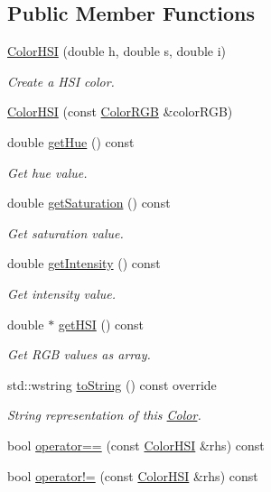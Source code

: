 \subsection*{Public Member Functions}
\begin{DoxyCompactItemize}
\item 
\hyperlink{classmastermind_1_1logic_1_1_color_h_s_i_a6e7465e8b360f30c35a6a27af15edfbe}{Color\+H\+SI} (double h, double s, double i)
\begin{DoxyCompactList}\small\item\em Create a H\+SI color. \end{DoxyCompactList}\item 
\hyperlink{classmastermind_1_1logic_1_1_color_h_s_i_a51e112e86cd7167eb5f2f7af72ba0a08}{Color\+H\+SI} (const \hyperlink{classmastermind_1_1logic_1_1_color_r_g_b}{Color\+R\+GB} \&color\+R\+GB)
\item 
double \hyperlink{classmastermind_1_1logic_1_1_color_h_s_i_ae22e195f505ccf77516944c3ea3062c9}{get\+Hue} () const
\begin{DoxyCompactList}\small\item\em Get hue value. \end{DoxyCompactList}\item 
double \hyperlink{classmastermind_1_1logic_1_1_color_h_s_i_a87b20bf4081e02865f648b1acc6e9b72}{get\+Saturation} () const
\begin{DoxyCompactList}\small\item\em Get saturation value. \end{DoxyCompactList}\item 
double \hyperlink{classmastermind_1_1logic_1_1_color_h_s_i_ab19f6d65c2b7a458de084738d017342a}{get\+Intensity} () const
\begin{DoxyCompactList}\small\item\em Get intensity value. \end{DoxyCompactList}\item 
double $\ast$ \hyperlink{classmastermind_1_1logic_1_1_color_h_s_i_aebf66c900b34e386b8ae72587f418ce9}{get\+H\+SI} () const
\begin{DoxyCompactList}\small\item\em Get R\+GB values as array. \end{DoxyCompactList}\item 
std\+::wstring \hyperlink{classmastermind_1_1logic_1_1_color_h_s_i_a2cba1eccd441e55eef75639c2cf9433c}{to\+String} () const override
\begin{DoxyCompactList}\small\item\em String representation of this \hyperlink{classmastermind_1_1logic_1_1_color}{Color}. \end{DoxyCompactList}\item 
bool \hyperlink{classmastermind_1_1logic_1_1_color_h_s_i_a63c8f95133b9c9e9936520e7cd2754fb}{operator==} (const \hyperlink{classmastermind_1_1logic_1_1_color_h_s_i}{Color\+H\+SI} \&rhs) const
\item 
bool \hyperlink{classmastermind_1_1logic_1_1_color_h_s_i_a32082591e8e68503c45e0516d7f62748}{operator!=} (const \hyperlink{classmastermind_1_1logic_1_1_color_h_s_i}{Color\+H\+SI} \&rhs) const
\end{DoxyCompactItemize}
